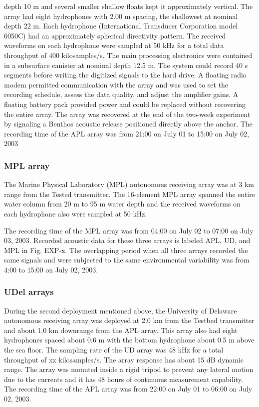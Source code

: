 depth 10 m and several smaller shallow floats kept it approximately
vertical.   The array had eight hydrophones with 2.00 m spacing, the
shallowest at nominal depth 22 m. Each hydrophone (International
Transducer Corporation model 6050C) had an approximately spherical
directivity pattern.  The received waveforms on each hydrophone were
sampled at 50 kHz for a total data throughput of 400 kilosamples/s.
The main processing electronics were contained in a subsurface
canister at nominal depth 12.5 m.  The system could record 40 s
segments before writing the digitized signals to the hard drive.  A
floating radio modem permitted communication with the array and was
used to set the recording schedule, assess the data quality, and
adjust the amplifier gains.  A floating battery pack provided power
and could be replaced without recovering the entire array.  The
array was recovered at the end of the two-week experiment by
signaling a Benthos acoustic release positioned directly above the
anchor. The recording time of the APL array was from 21:00 on July
01 to 15:00 on July 02, 2003
\subsubsection{MPL array}
The Marine Physical Laboratory (MPL) autonomous receiving array was
at 3 km range from the Tested transmitter. The 16-element MPL array
spanned the entire water column from 20 m to 95 m water depth and
the received waveforms on each hydrophone also were sampled at 50
kHz.

The recording time of the MPL array was from 04:00 on July 02 to
07:00 on July 03, 2003. Recorded acoustic data for these three
arrays is labeled APL, UD, and MPL in Fig. EXP-x. The overlapping
period when all three arrays recorded the same signals and were
subjected to the same environmental variability was from 4:00 to
15:00 on July 02, 2003.

\subsubsection{UDel arrays}
During the second deployment mentioned above, the University of
Delaware autonomous receiving array was deployed at 2.0 km from the
Testbed transmitter and about 1.0 km downrange from the APL array.
This array also had eight hydrophones spaced about 0.6 m with the
bottom hydrophone about 0.5 m above the sea floor. The sampling rate
of the UD array was 48 kHz for a total throughput of xx
kilosamples/s. The array response has about 15 dB dynamic range. The
array was mounted inside a rigid tripod to prevent any lateral
motion due to the currents and it has 48 hours of continuous
measurement capability. The recording time of the APL array was from
22:00 on July 01 to 06:00 on July 02, 2003.

